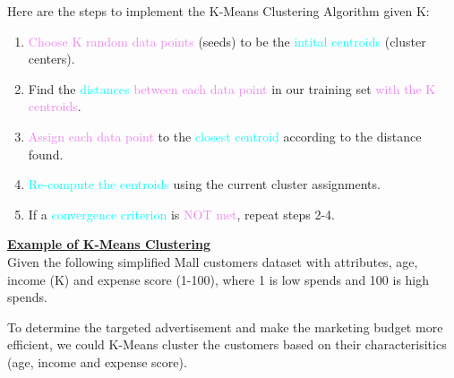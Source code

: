 \documentclass{book}
\begin{document}
Here are the steps to implement the K-Means Clustering Algorithm given K:\\
\vspace{2mm}
\begin{enumerate}
    \item \textcolor{violet}{Choose K random data points} (seeds) to be the \textcolor{cyan}{intital centroids} (cluster centers).
    \item Find the \textcolor{cyan}{distances} \textcolor{violet}{between each data point} in our training set \textcolor{violet}{with the K centroids}.
    \item \textcolor{violet}{Assign each data point} to the \textcolor{cyan}{closest centroid} according to the distance found.
    \item \textcolor{cyan}{Re-compute the centroids} using the current cluster assignments.
    \item If a \textcolor{cyan}{convergence criterion} is \textcolor{violet}{NOT met}, repeat steps 2-4.
\end{enumerate}
\vspace{2mm}
\underline{\textbf{Example of K-Means Clustering}}\\
Given the following simplified Mall customers dataset with attributes, age, income (K) and expense score (1-100), where 1 is low spends and 100 is high spends.\\
\begin{center}
\end{center}
To determine the targeted advertisement and make the marketing budget more efficient, we could K-Means cluster the customers based on their characterisitics (age, income and expense score).\\
\end{document}
